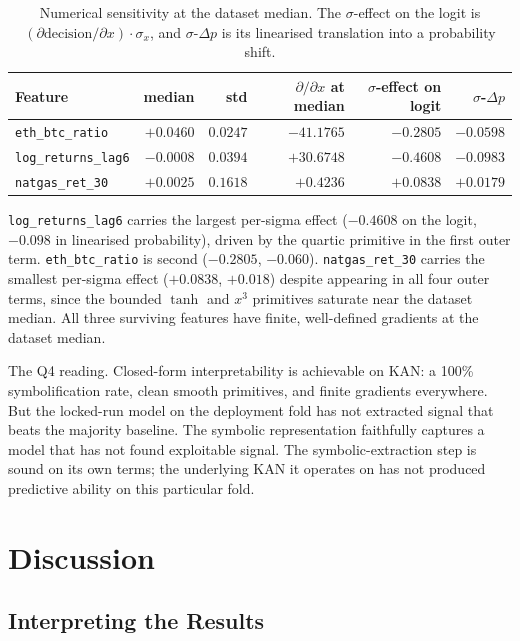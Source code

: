 \documentclass[12pt,a4paper,oneside]{article}
\begin{document}
\begin{table}[H]
\centering
\footnotesize
\begin{tabular}{lrrrrr}
\toprule
Feature & median & std & $\partial/\partial x$ at median & $\sigma$-effect on logit & $\sigma$-$\Delta p$ \\
\midrule
\texttt{eth\_btc\_ratio}     & $+0.0460$ & $0.0247$ & $-41.1765$ & $-0.2805$ & $-0.0598$ \\
\texttt{log\_returns\_lag6}  & $-0.0008$ & $0.0394$ & $+30.6748$ & $-0.4608$ & $-0.0983$ \\
\texttt{natgas\_ret\_30}     & $+0.0025$ & $0.1618$ & $+0.4236$  & $+0.0838$ & $+0.0179$ \\
\bottomrule
\end{tabular}
\caption{Numerical sensitivity at the dataset median. The $\sigma$-effect on the logit is $(\partial \text{decision} / \partial x) \cdot \sigma_x$, and $\sigma$-$\Delta p$ is its linearised translation into a probability shift.}
\label{tab:sensitivity}
\end{table}

\texttt{log\_returns\_lag6} carries the largest per-sigma effect ($-0.4608$ on the logit, $-0.098$ in linearised probability), driven by the quartic primitive in the first outer term. \texttt{eth\_btc\_ratio} is second ($-0.2805$, $-0.060$). \texttt{natgas\_ret\_30} carries the smallest per-sigma effect ($+0.0838$, $+0.018$) despite appearing in all four outer terms, since the bounded $\tanh$ and $x^3$ primitives saturate near the dataset median. All three surviving features have finite, well-defined gradients at the dataset median.

The Q4 reading. Closed-form interpretability is achievable on KAN: a 100\% symbolification rate, clean smooth primitives, and finite gradients everywhere. But the locked-run model on the deployment fold has not extracted signal that beats the majority baseline. The symbolic representation faithfully captures a model that has not found exploitable signal. The symbolic-extraction step is sound on its own terms; the underlying KAN it operates on has not produced predictive ability on this particular fold.

\section{Discussion}\label{sec:discussion}


\subsection{Interpreting the Results}\label{subsec:disc_results}
\end{document}
